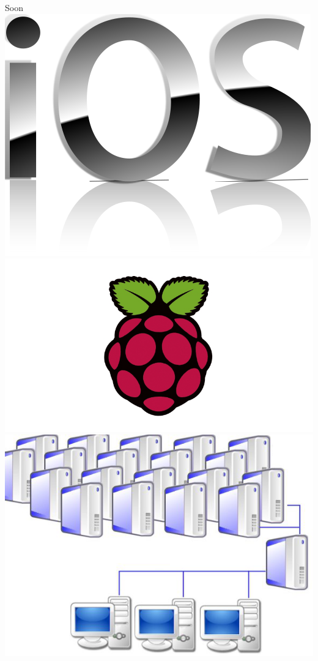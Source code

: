 \documentclass[12pt]{beamer}
\begin{document}
\begin{frame}
\begin{columns}
\begin{block}{Soon}
  \includegraphics[height=0.15\textheight]{img/ios} \\
  \includegraphics[height=0.15\textheight]{img/rpi} \\
  \includegraphics[height=0.15\textheight]{img/mpi}

\end{block}
\end{columns}
\end{frame}
\end{document}
